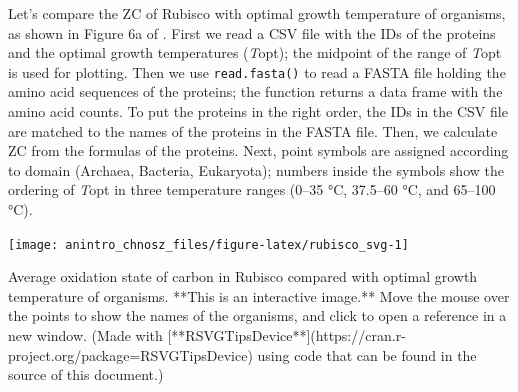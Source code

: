 \documentclass[]{tufte-book}
\begin{document}
Let's compare the ZC of Rubisco with optimal growth temperature of
organisms, as shown in Figure 6a of \citet{Dic14}. First we read a CSV
file with the IDs of the proteins and the optimal growth temperatures
(\emph{T}opt); the midpoint of the range of \emph{T}opt is used for
plotting. Then we use {\texttt{read.fasta()}} to read a FASTA file
holding the amino acid sequences of the proteins; the function returns a
data frame with the amino acid counts. To put the proteins in the right
order, the IDs in the CSV file are matched to the names of the proteins
in the FASTA file. Then, we calculate ZC from the formulas of the
proteins. Next, point symbols are assigned according to domain (Archaea,
Bacteria, Eukaryota); numbers inside the symbols show the ordering of
\emph{T}opt in three temperature ranges (0--35 °C, 37.5--60 °C, and
65--100 °C).

\begin{marginfigure}
\texttt{[image: anintro\_chnosz\_files/figure-latex/rubisco\_svg-1]} \caption[Average oxidation state of carbon in Rubisco compared with optimal growth temperature of organisms]{Average oxidation state of carbon in Rubisco compared with optimal growth temperature of organisms. **This is an interactive image.** Move the mouse over the points to show the names of the organisms, and click to open a reference in a new window. (Made with [**RSVGTipsDevice**](https://cran.r-project.org/package=RSVGTipsDevice) using code that can be found in the source of this document.)}\label{fig:rubisco_svg}
\end{marginfigure}
\end{document}
